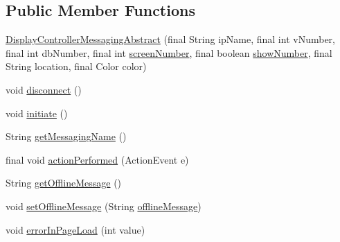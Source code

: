 \subsection*{Public Member Functions}
\begin{DoxyCompactItemize}
\item 
\hyperlink{classgov_1_1fnal_1_1ppd_1_1dd_1_1display_1_1client_1_1DisplayControllerMessagingAbstract_a29d30efd5c44b5ac8ad2044fc8e9209e}{Display\-Controller\-Messaging\-Abstract} (final String ip\-Name, final int v\-Number, final int db\-Number, final int \hyperlink{classgov_1_1fnal_1_1ppd_1_1dd_1_1display_1_1DisplayImpl_ace620614bde13cee492129c27f38db4e}{screen\-Number}, final boolean \hyperlink{classgov_1_1fnal_1_1ppd_1_1dd_1_1display_1_1client_1_1DisplayControllerMessagingAbstract_aca138d2835d0f3794bc86261ad550f18}{show\-Number}, final String location, final Color color)
\item 
void \hyperlink{classgov_1_1fnal_1_1ppd_1_1dd_1_1display_1_1client_1_1DisplayControllerMessagingAbstract_ab4669eeb7e29918c88f15ea2afc17604}{disconnect} ()
\item 
void \hyperlink{classgov_1_1fnal_1_1ppd_1_1dd_1_1display_1_1client_1_1DisplayControllerMessagingAbstract_ae25c8ff7cfa18c137ff9b0a04f65fd8c}{initiate} ()
\item 
String \hyperlink{classgov_1_1fnal_1_1ppd_1_1dd_1_1display_1_1client_1_1DisplayControllerMessagingAbstract_a7d2a03dd8cfa663368cbcf67fbcf804e}{get\-Messaging\-Name} ()
\item 
final void \hyperlink{classgov_1_1fnal_1_1ppd_1_1dd_1_1display_1_1client_1_1DisplayControllerMessagingAbstract_a669e9d8cd86408c7b578c7b5c39650b7}{action\-Performed} (Action\-Event e)
\item 
String \hyperlink{classgov_1_1fnal_1_1ppd_1_1dd_1_1display_1_1client_1_1DisplayControllerMessagingAbstract_a02fcbfd5923cccc17585007ceb7cc558}{get\-Offline\-Message} ()
\item 
void \hyperlink{classgov_1_1fnal_1_1ppd_1_1dd_1_1display_1_1client_1_1DisplayControllerMessagingAbstract_ac134aed7d435082990e7ede49f5a641c}{set\-Offline\-Message} (String \hyperlink{classgov_1_1fnal_1_1ppd_1_1dd_1_1display_1_1client_1_1DisplayControllerMessagingAbstract_a6c6ececd9f4e0f03ff305dedcc8d81cf}{offline\-Message})
\item 
void \hyperlink{classgov_1_1fnal_1_1ppd_1_1dd_1_1display_1_1client_1_1DisplayControllerMessagingAbstract_a3d9858154eb1bf65755cf3eab56539ad}{error\-In\-Page\-Load} (int value)
\end{DoxyCompactItemize}
